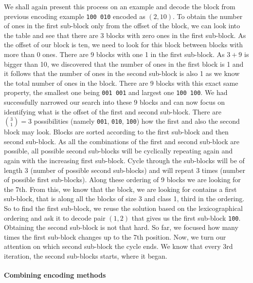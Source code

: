 
We shall again present this process on an example and decode the block from previous
encoding example {\tt 100 010} encoded as $(2, 10)$. To obtain the number of ones in
the first sub-block only from the offset of the block, we can look into the table and
see that there are 3 blocks with zero ones in the first sub-block. As the offset of our
block is ten, we need to look for this block between blocks with more than 0 ones. There
are 9 blocks with one 1 in the first sub-block. As $3+9$ is bigger than 10, we discovered
that the number of ones in the first block is 1 and it follows that the number of ones in
the second sub-block is
also 1 as we know the total number of ones in the block. There are 9 blocks with
this exact same property, the smallest one being {\tt 001 001} and largest one
{\tt 100 100}. We had successfully narrowed our search into these 9 blocks and can now
focus on identifying what is the offset of the first and second sub-block. There are
${3 \choose 1} = 3$ possibilities (namely {\tt 001}, {\tt 010}, {\tt 100}) how the first
and also the second block may look. Blocks are sorted according
to the first sub-block and then second sub-block. As all the combinations of the first
and second sub-block are possible, all possible second sub-blocks will be cyclically
repeating again and again with the increasing first sub-block. Cycle through
the sub-blocks will be of length 3 (number of possible second sub-blocks) and will repeat
3 times (number of possible first sub-blocks). Along these ordering of 9 blocks we are
looking for the 7th. From this, we know that the block, we are looking for contains a
first sub-block, that is along all the blocks of size 3 and class 1, third in the ordering.
So to find the first sub-block, we reuse the solution based on the lexicographical ordering
and ask it to decode pair $(1, 2)$ that gives us the first sub-block {\tt 100}. Obtaining
the second sub-block is not that hard. So far, we focused how many times the first sub-block
changes up to the 7th position. Now, we turn our attention on which second sub-block the cycle
ends. We know that every 3rd iteration, the second sub-blocks starts, where it began.

\paragraph{Combining encoding methods}


